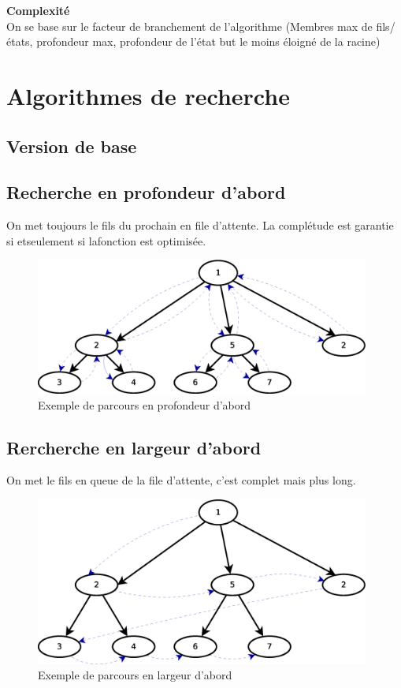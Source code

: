 \documentclass[12pt,a4paper,openany]{book}
\begin{document}
		\begin{definition}
			\textbf{Complexité}\\
			On se base sur le facteur de branchement de l'algorithme (Membres max de fils/états, profondeur max, profondeur de l'état but le moins éloigné de la
			racine)
		\end{definition}
		\section{Algorithmes de recherche}
		\subsection{Version de base}
		
		
		\subsection{Recherche en profondeur d'abord}
		On met toujours le fils du prochain en file d'attente. La complétude est garantie si etseulement si lafonction est optimisée.

		\begin{figure}[H]
			\centering
			\includegraphics[width=11cm]{Diag1.eps}
			\caption{Exemple de parcours en profondeur d'abord}
		\end{figure}
		\subsection{Rercherche en largeur d'abord}
		On met le fils en queue de la file d'attente, c'est complet mais plus long.
		\begin{figure}[H]
			\centering
			\includegraphics[width=11cm]{Diag2.eps}
			\caption{Exemple de parcours en largeur d'abord}
		\end{figure}
\end{document}
